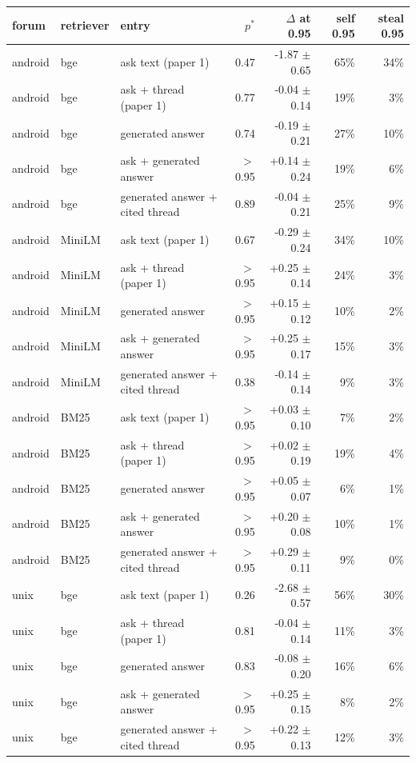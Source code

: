 \begin{tabular}{lllrrrr}
\toprule
forum & retriever & entry & $p^*$ & $\Delta$ at 0.95 & self 0.95 & steal 0.95 \\
\midrule
android & bge & ask text (paper 1) & 0.47 & -1.87 $\pm$ 0.65 & 65\% & 34\% \\
android & bge & ask + thread (paper 1) & 0.77 & -0.04 $\pm$ 0.14 & 19\% & 3\% \\
android & bge & generated answer & 0.74 & -0.19 $\pm$ 0.21 & 27\% & 10\% \\
android & bge & ask + generated answer & $>$0.95 & +0.14 $\pm$ 0.24 & 19\% & 6\% \\
android & bge & generated answer + cited thread & 0.89 & -0.04 $\pm$ 0.21 & 25\% & 9\% \\
\midrule
android & MiniLM & ask text (paper 1) & 0.67 & -0.29 $\pm$ 0.24 & 34\% & 10\% \\
android & MiniLM & ask + thread (paper 1) & $>$0.95 & +0.25 $\pm$ 0.14 & 24\% & 3\% \\
android & MiniLM & generated answer & $>$0.95 & +0.15 $\pm$ 0.12 & 10\% & 2\% \\
android & MiniLM & ask + generated answer & $>$0.95 & +0.25 $\pm$ 0.17 & 15\% & 3\% \\
android & MiniLM & generated answer + cited thread & 0.38 & -0.14 $\pm$ 0.14 & 9\% & 3\% \\
\midrule
android & BM25 & ask text (paper 1) & $>$0.95 & +0.03 $\pm$ 0.10 & 7\% & 2\% \\
android & BM25 & ask + thread (paper 1) & $>$0.95 & +0.02 $\pm$ 0.19 & 19\% & 4\% \\
android & BM25 & generated answer & $>$0.95 & +0.05 $\pm$ 0.07 & 6\% & 1\% \\
android & BM25 & ask + generated answer & $>$0.95 & +0.20 $\pm$ 0.08 & 10\% & 1\% \\
android & BM25 & generated answer + cited thread & $>$0.95 & +0.29 $\pm$ 0.11 & 9\% & 0\% \\
\midrule
unix & bge & ask text (paper 1) & 0.26 & -2.68 $\pm$ 0.57 & 56\% & 30\% \\
unix & bge & ask + thread (paper 1) & 0.81 & -0.04 $\pm$ 0.14 & 11\% & 3\% \\
unix & bge & generated answer & 0.83 & -0.08 $\pm$ 0.20 & 16\% & 6\% \\
unix & bge & ask + generated answer & $>$0.95 & +0.25 $\pm$ 0.15 & 8\% & 2\% \\
unix & bge & generated answer + cited thread & $>$0.95 & +0.22 $\pm$ 0.13 & 12\% & 3\% \\

\end{tabular}
